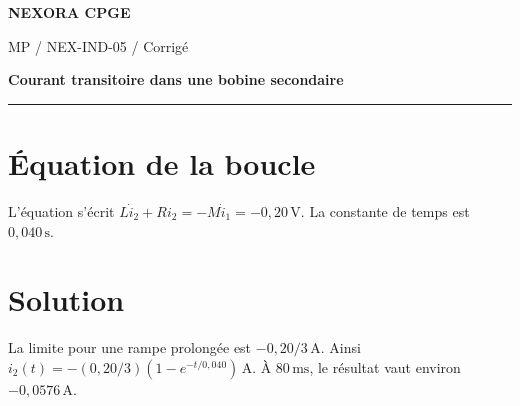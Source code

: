 \documentclass[11pt,a4paper]{article}
\begin{document}
{\small\bfseries\color{nexorablue} NEXORA CPGE}\par
{\small MP / NEX-IND-05 / Corrigé}\par
{\LARGE\bfseries Courant transitoire dans une bobine secondaire}\par
\vspace{0.25em}\hrule\vspace{0.6em}

\section*{Équation de la boucle}
L’équation s’écrit $L\dot i_2+Ri_2=-M\dot i_1=-0{,}20\,\mathrm V$. La constante de temps est $0{,}040\,\mathrm s$.

\section*{Solution}
La limite pour une rampe prolongée est $-0{,}20/3\,\mathrm A$. Ainsi $i_2(t)=-(0{,}20/3)(1-e^{-t/0{,}040})\,\mathrm A$. À $80\,\mathrm{ms}$, le résultat vaut environ $-0{,}0576\,\mathrm A$.
\end{document}

